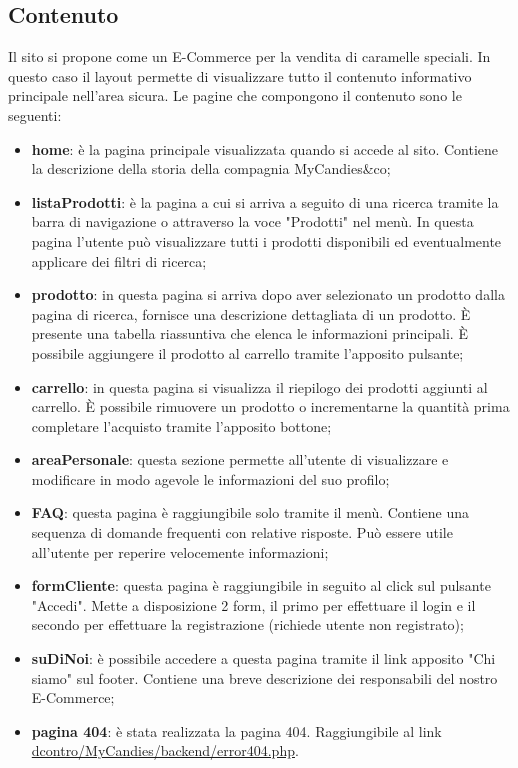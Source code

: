 \subsection{Contenuto}
Il sito si propone come un E-Commerce per la vendita di caramelle speciali. In questo caso il layout permette di visualizzare tutto il contenuto informativo principale nell'area sicura.
Le pagine che compongono il contenuto sono le seguenti:
\begin{itemize}
    \item \textbf{home}: è la pagina principale visualizzata quando si accede al sito. Contiene la descrizione della storia della compagnia MyCandies\&co;
    \item \textbf{listaProdotti}: è la pagina a cui si arriva a seguito di una ricerca tramite la barra di navigazione o attraverso la voce "Prodotti" nel menù. In questa pagina l'utente può visualizzare tutti i prodotti disponibili ed eventualmente applicare dei filtri di ricerca;
    \item \textbf{prodotto}: in questa pagina si arriva dopo aver selezionato un prodotto dalla pagina di ricerca, fornisce una descrizione dettagliata di un prodotto. È presente una tabella riassuntiva che elenca le informazioni principali. È possibile aggiungere il prodotto al carrello tramite l'apposito pulsante;
    \item \textbf{carrello}: in questa pagina si visualizza il riepilogo dei prodotti aggiunti al carrello. È possibile rimuovere un prodotto o incrementarne la quantità prima completare l'acquisto tramite l'apposito bottone;
    \item \textbf{areaPersonale}: questa sezione permette all'utente di visualizzare e modificare in modo agevole le informazioni del suo profilo;
    \item \textbf{FAQ}: questa pagina è raggiungibile solo tramite il menù. Contiene una sequenza di domande frequenti con relative risposte. Può essere utile all'utente per reperire velocemente informazioni;
    \item \textbf{formCliente}: questa pagina è raggiungibile in seguito al click sul pulsante "Accedi". Mette a disposizione 2 form, il primo per effettuare il login e il secondo per effettuare la registrazione (richiede utente non registrato);
    \item \textbf{suDiNoi}: è possibile accedere a questa pagina tramite il link apposito "Chi siamo" sul footer. Contiene una breve descrizione dei responsabili del nostro E-Commerce;
    \item \textbf{pagina 404}: è stata realizzata la pagina 404. Raggiungibile al link \url{dcontro/MyCandies/backend/error404.php}.
\end{itemize}

